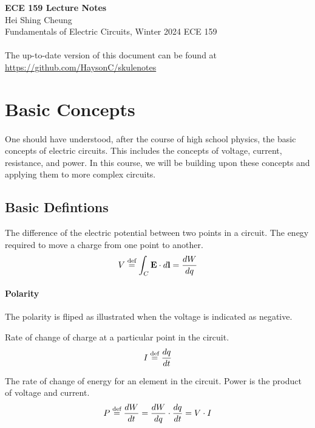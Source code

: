 \documentclass[11pt]{article}
\begin{document}
\thispagestyle{empty}
{\LARGE \bf ECE 159 Lecture Notes}\\
{\large Hei Shing Cheung}\\
Fundamentals of Electric Circuits, Winter 2024 \hfill ECE 159\\
\\
The up-to-date version of this document can be found at \url{https://github.com/HaysonC/skulenotes}\\
\vspace{10pt}
\section{Basic Concepts}
\paragraph{} One should have understood, after the course of high school physics, the basic concepts of electric circuits. This includes the concepts of voltage, current, resistance, and power. In this course, we will be building upon these concepts and applying them to more complex circuits. 
\subsection{Basic Defintions}
\begin{definition}[Voltage]
    The difference of the electric potential between two points in a circuit. The enegy required to move a charge from one point to another.
    \begin{equation}
        V \stackrel{\text{def}}{=} \int_C \textbf{E} \cdot d\textbf{l} = \frac{dW}{dq}
    \end{equation}
    \end{definition}
    \paragraph{Polarity} The polarity is fliped as illustrated when the voltage is indicated as negative.
    \begin{definition}[Current]
    Rate of change of charge at a particular point in the circuit.
    \begin{equation}
        I \stackrel{\text{def}}{=} \frac{dq}{dt}
    \end{equation}
    \end{definition}
    
    \begin{definition}[Power]
    The rate of change of energy for an element in the circuit. Power is the product of voltage and current.
    \begin{equation}
        P \stackrel{\text{def}}{=} \frac{dW}{dt} = \frac{dW}{dq} \cdot \frac{dq}{dt} = V \cdot I
    \end{equation}
    \end{definition}
    
\end{document}
